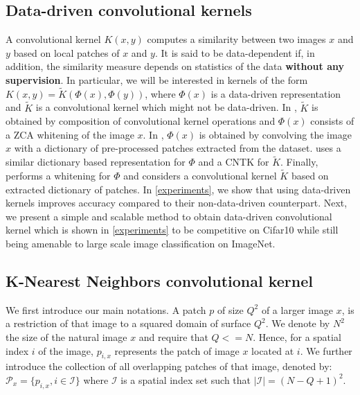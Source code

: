 \documentclass{article} %
\newcommand{\Edouard}[1]{\textcolor{blue}{#1}}
\begin{document}
\subsection{Data-driven convolutional kernels}\label{sec:data-driven_kernels}
A convolutional kernel $K(x,y)$ computes a similarity between two images $x$ and $y$ based on local patches of $x$ and $y$. It is said to be data-dependent if, in addition, the similarity measure depends on statistics of the data \textbf{without any supervision}. In particular, we will be interested in kernels of the form $K(x,y)=  \widetilde{K}(\Phi(x),\Phi(y))$, where $\Phi(x)$ is a data-driven representation and $\widetilde{K}$ is a convolutional kernel which might not be data-driven. In \cite{shankar2020neural}, $\widetilde{K}$ is obtained by composition of convolutional kernel operations and $\Phi(x)$ consists of a ZCA whitening of the image $x$. In \cite{coates2011analysis,recht2019imagenet}, $\Phi(x)$ is obtained by convolving the image $x$ with a dictionary of pre-processed patches extracted from the dataset. \cite{li2019enhanced} uses a similar dictionary based representation for $\Phi$ and a CNTK for $\widetilde{K}$. Finally, \cite{mairal2016end} performs a whitening for $\Phi$ and considers a convolutional kernel $\widetilde{K}$ based on extracted dictionary of patches. In \ref{experiments}, we show that using data-driven kernels improves accuracy compared to their non-data-driven counterpart. Next, we present a simple and scalable method to obtain data-driven convolutional kernel which is  shown in \ref{experiments} to be competitive on Cifar10 while still being amenable to large scale image classification on ImageNet. 
\subsection{K-Nearest Neighbors convolutional kernel}\label{knn}
We first introduce our main notations. A patch $p$ of size $Q^2$ of a larger image $x$, is a  restriction of that image to a squared domain of surface $Q^2$. We denote by $N^2$ the size of the natural image $x$ and require that $Q<=N$. Hence, for a spatial index $i$ of the image,  $p_{i,x}$ represents the patch of image $x$ located at $i$.
We further introduce the collection of all overlapping patches of that image, denoted by: $\mathcal{P}_x=\{p_{i,x},i\in\mathcal{I}\}$ where $\mathcal{I}$ is a spatial index set such that $|\mathcal{I}|=(N-Q+1)
^2$. 
\end{document}
